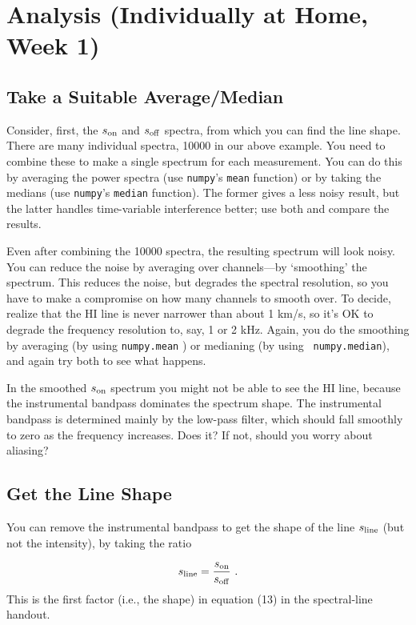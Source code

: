 \documentclass[11pt,preprint]{aastex}
\begin{document}
\section{Analysis (Individually at Home, Week 1)} \label{analysis}

\subsection{Take a Suitable Average/Median}

\noindent
Consider, first, the $s_{\rm on}$ and $s_{\rm off}$ spectra, from which
you can find the line shape. There are many individual spectra, 10000 in
our above example. You need to combine these to make a single spectrum
for each measurement. You can do this by averaging the power spectra
(use {\tt numpy}'s {\tt mean} function) or by taking the medians (use {\tt numpy}'s
{\tt median} function). The former gives a less noisy result, but the
latter handles time-variable interference better; use both and compare
the results.

Even after combining the 10000 spectra, the resulting
spectrum will look noisy.  You can reduce the noise by averaging
over channels---by `smoothing' the spectrum. This reduces the noise, but
degrades the spectral resolution, so you have to make a compromise on
how many channels to smooth over. To decide, realize that the HI line is
never narrower than about 1 km/s, so it's OK to degrade the frequency
resolution to, say, 1 or 2 kHz. Again, you do the smoothing by averaging
(by using {\tt numpy.mean} ) or medianing (by using {\tt
  numpy.median}), and again try both to see what happens.

In the smoothed $s_{\rm on}$ spectrum you might not be able to see the
HI line, because the instrumental bandpass dominates the spectrum
shape. The instrumental bandpass is determined mainly by the low-pass
filter, which should fall smoothly to zero as the frequency
increases. Does it? If not, should you worry about aliasing?

\subsection{Get the Line Shape}

You can remove the instrumental bandpass to get the shape
of the line $s_{\rm line}$ (but not the intensity), by taking the ratio 

\begin{equation}
s_{\rm line} = \frac{s_{\rm on}}{s_{\rm off}} \ .
\end{equation}
%
This is the first factor (i.e., the shape) in equation
(13) in the spectral-line handout.
%
\end{document}
